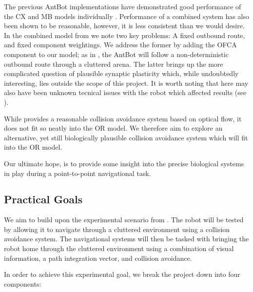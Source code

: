 \documentclass[a4paper,11pt,twoside,openright]{article}
\begin{document}
The previous AntBot implementations have demonstrated good performance of the CX
and MB models individually \cite{Scimeca2017, Mitchell2018}. Performance of
a combined system has also been shown to be reasonable, however, it is less
consistent than we would desire\cite{Zhang2017}. In the combined model from
\cite{Zhang2017} we note two key problems: A fixed outbound route, and fixed
component weightings. We address the former by adding the OFCA component to our
model; as in \cite{Mitchell2018}, the AntBot will follow a non-deterministic
outbound route through a cluttered arena. The latter brings up the more
complicated question of plausible synaptic plasticity which, while undoubtedly
interesting, lies outside the scope of this project. It is worth noting that here
may also have been unknown tecnical issues with the robot which affected results
(see \cite{Mitchell2018}).
\newline
\par

While \cite{Mitchell2018} provides a reasonable collision avoidance system
based on optical flow, it does not fit so neatly into the OR model. We therefore
aim to explore an alternative, yet still biologically plausible collision
avoidance system which will fit into the OR model.
\newline
\par

Our ultimate hope, is to provide some insight into the precise biological
systems in play during a point-to-point navigational task.

\subsection { Practical Goals }
We aim to build upon the experimental scenario from \cite{Mitchell2018}. The
robot will be tested by allowing it to navigate through a cluttered environment
using a collision avoidance system. The navigational systems will then be
tasked with bringing the robot home through the cluttered environment using
a combination of visual information, a path integration vector, and
collision avoidance.
\newline
\par

In order to achieve this experimental goal, we break the project down
into four components:
\end{document}
